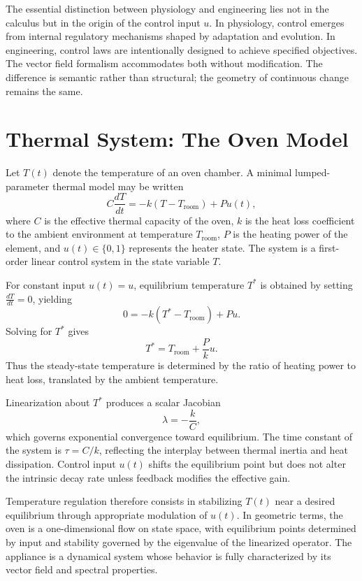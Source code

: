 \documentclass[12pt]{book}
\begin{document}
The essential distinction between physiology and engineering lies not
in the calculus but in the origin of the control input $u$. In
physiology, control emerges from internal regulatory mechanisms shaped
by adaptation and evolution. In engineering, control laws are
intentionally designed to achieve specified objectives. The vector
field formalism accommodates both without modification. The
difference is semantic rather than structural; the geometry of
continuous change remains the same.

\section{Thermal System: The Oven Model}

Let $T(t)$ denote the temperature of an oven chamber. A minimal
lumped-parameter thermal model may be written
\[
C \frac{dT}{dt}
=
- k (T - T_{\text{room}})
+
P u(t),
\]
where $C$ is the effective thermal capacity of the oven, $k$ is the
heat loss coefficient to the ambient environment at temperature
$T_{\text{room}}$, $P$ is the heating power of the element, and
$u(t) \in \{0,1\}$ represents the heater state. The system is a
first-order linear control system in the state variable $T$.

For constant input $u(t) = u$, equilibrium temperature $T^*$ is
obtained by setting $\frac{dT}{dt} = 0$, yielding
\[
0 = - k (T^* - T_{\text{room}}) + P u.
\]
Solving for $T^*$ gives
\[
T^* = T_{\text{room}} + \frac{P}{k} u.
\]
Thus the steady-state temperature is determined by the ratio of
heating power to heat loss, translated by the ambient temperature.

Linearization about $T^*$ produces a scalar Jacobian
\[
\lambda = -\frac{k}{C},
\]
which governs exponential convergence toward equilibrium. The time
constant of the system is $\tau = C/k$, reflecting the interplay
between thermal inertia and heat dissipation. Control input $u(t)$
shifts the equilibrium point but does not alter the intrinsic decay
rate unless feedback modifies the effective gain.

Temperature regulation therefore consists in stabilizing $T(t)$ near
a desired equilibrium through appropriate modulation of $u(t)$. In
geometric terms, the oven is a one-dimensional flow on state space,
with equilibrium points determined by input and stability governed by
the eigenvalue of the linearized operator. The appliance is a
dynamical system whose behavior is fully characterized by its vector
field and spectral properties.
\end{document}
